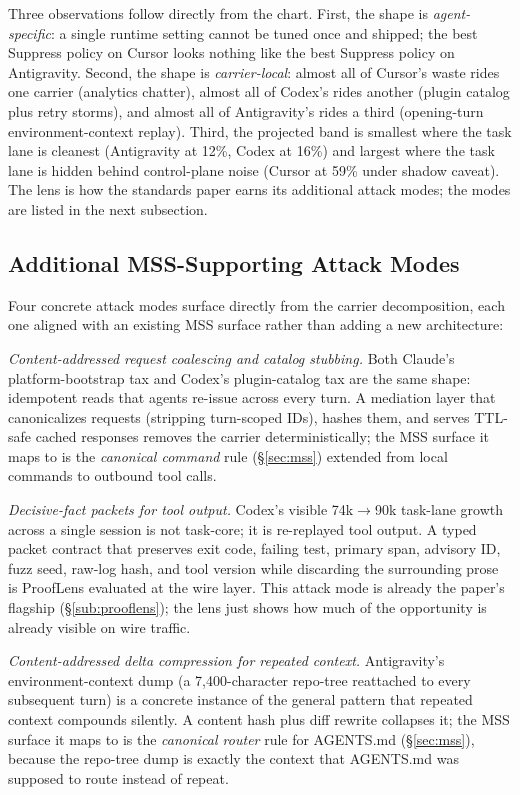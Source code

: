 \documentclass[conference]{IEEEtran}
\newcommand{\mss}{\textnormal{\textsc{MSS}}}
\begin{document}
Three observations follow directly from the chart. First, the shape is \emph{agent-specific}: a single runtime setting cannot be tuned once and shipped; the best Suppress policy on Cursor looks nothing like the best Suppress policy on Antigravity. Second, the shape is \emph{carrier-local}: almost all of Cursor's waste rides one carrier (analytics chatter), almost all of Codex's rides another (plugin catalog plus retry storms), and almost all of Antigravity's rides a third (opening-turn environment-context replay). Third, the projected band is smallest where the task lane is cleanest (Antigravity at 12\%, Codex at 16\%) and largest where the task lane is hidden behind control-plane noise (Cursor at 59\% under shadow caveat). The lens is how the standards paper earns its additional attack modes; the modes are listed in the next subsection.

\subsection{Additional MSS-Supporting Attack Modes}
\label{sec:additional-attack-modes}

Four concrete attack modes surface directly from the carrier decomposition, each one aligned with an existing \mss{} surface rather than adding a new architecture:

\emph{Content-addressed request coalescing and catalog stubbing.} Both Claude's platform-bootstrap tax and Codex's plugin-catalog tax are the same shape: idempotent reads that agents re-issue across every turn. A mediation layer that canonicalizes requests (stripping turn-scoped IDs), hashes them, and serves TTL-safe cached responses removes the carrier deterministically; the MSS surface it maps to is the \emph{canonical command} rule (\S\ref{sec:mss}) extended from local commands to outbound tool calls.

\emph{Decisive-fact packets for tool output.} Codex's visible 74k$\to$90k task-lane growth across a single session is not task-core; it is re-replayed tool output. A typed packet contract that preserves exit code, failing test, primary span, advisory ID, fuzz seed, raw-log hash, and tool version while discarding the surrounding prose is ProofLens evaluated at the wire layer. This attack mode is already the paper's flagship (\S\ref{sub:prooflens}); the lens just shows how much of the opportunity is already visible on wire traffic.

\emph{Content-addressed delta compression for repeated context.} Antigravity's environment-context dump (a 7,400-character repo-tree reattached to every subsequent turn) is a concrete instance of the general pattern that repeated context compounds silently. A content hash plus diff rewrite collapses it; the MSS surface it maps to is the \emph{canonical router} rule for AGENTS.md (\S\ref{sec:mss}), because the repo-tree dump is exactly the context that AGENTS.md was supposed to route instead of repeat.
\end{document}
